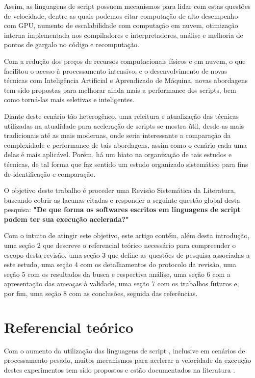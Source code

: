 \documentclass[sigconf]{acmart}
\begin{document}
Assim, as linguagens de script possuem mecanismos para lidar com estas questões de velocidade, dentre as quais podemos citar computação de alto desempenho com GPU, aumento de escalabilidade com computação em nuvem, otimização interna implementada nos compiladores e interpretadores, análise e melhoria de pontos de gargalo no código e recomputação.

Com a redução dos preços de recursos computacionais físicos e em nuvem, o que facilitou o acesso à processamento intensivo, e o desenvolvimento de novas técnicas com Inteligência Artificial e Aprendizado de Máquina, novas abordagens tem sido propostas para melhorar ainda mais a performance dos scripts, bem como torná-las mais seletivas e inteligentes.

Diante deste cenário tão heterogêneo, uma releitura e atualização das técnicas utilizadas na atualidade para aceleração de scripts se mostra útil, desde as mais tradicionais até as mais modernas, onde seria interessante a comparação da complexidade e performance de tais abordagens, assim como o cenário cada uma delas é mais aplicável. Porém, há um hiato na organização de tais estudos e técnicas, de tal forma que faz sentido um estudo organizado sistemático para fins de identificação e comparação.

O objetivo deste trabalho é proceder uma Revisão Sistemática da Literatura, buscando cobrir as lacunas citadas e responder a seguinte questão global desta pesquisa: \textbf{"De que forma os softwares escritos em linguagens de script podem ter sua execução acelerada?"} 

Com o intuito de atingir este objetivo, este artigo contém, além desta introdução, uma seção 2 que descreve o referencial teórico necessário para compreender o escopo desta revisão, uma seção 3 que define as questões de pesquisa associadas a este estudo, uma seção 4 com os detalhamentos do protocolo da revisão, uma seção 5 com os resultados da busca e respectiva análise, uma seção 6 com a apresentação das ameaças à validade, uma seção 7 com os trabalhos futuros e, por fim, uma seção 8 com as conclusões, seguida das referências.


\section{Referencial teórico}
Com o aumento da utilização das linguagens de script \cite{IEEESpectrum:2020}\cite{GitHubOctoverse:2020}\cite{StackOverflow:2020}\cite{TIOBEIndex:2020}\cite{PYPL:2020}, inclusive em cenários de processamento pesado, muitos mecanismos para acelerar a velocidade da execução destes experimentos tem sido propostos e estão documentados na literatura \cite{nguyen2013cachetor}\cite{della2015performance}\cite{fitzpatrick2004distributed}.
\end{document}
